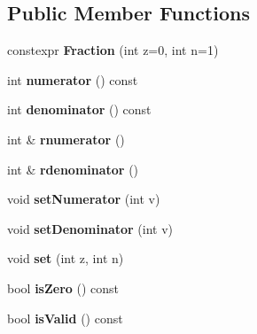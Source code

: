 \subsection*{Public Member Functions}
\begin{DoxyCompactItemize}
\item 
\mbox{\label{class_ms_1_1_fraction_adebecbbcf832847397c5864e2f1c5be7}} 
constexpr {\bfseries Fraction} (int z=0, int n=1)
\item 
\mbox{\label{class_ms_1_1_fraction_ac96ad0e3adbd7cac5e8f7264702178ff}} 
int {\bfseries numerator} () const
\item 
\mbox{\label{class_ms_1_1_fraction_af1e2d67466171dc13ed60e06f9cc3fc8}} 
int {\bfseries denominator} () const
\item 
\mbox{\label{class_ms_1_1_fraction_ae6c3b4af4c23e5958ed0d0618a86dc07}} 
int \& {\bfseries rnumerator} ()
\item 
\mbox{\label{class_ms_1_1_fraction_a299b24cc8e8da18426867638d7f6837a}} 
int \& {\bfseries rdenominator} ()
\item 
\mbox{\label{class_ms_1_1_fraction_afbafb8d881c955f439a39dfe9e07ea13}} 
void {\bfseries set\+Numerator} (int v)
\item 
\mbox{\label{class_ms_1_1_fraction_ae671ef315b71166777d5f3feeb3e3e92}} 
void {\bfseries set\+Denominator} (int v)
\item 
\mbox{\label{class_ms_1_1_fraction_a699aacd076e6ffb1415298fae0c08a92}} 
void {\bfseries set} (int z, int n)
\item 
\mbox{\label{class_ms_1_1_fraction_ac3244c876739eef5fa17e93e053bc599}} 
bool {\bfseries is\+Zero} () const
\item 
\mbox{\label{class_ms_1_1_fraction_acc3076889cb6d4019cd1406411c3656c}} 
bool {\bfseries is\+Valid} () const
\item 
\mbox{\label{class_ms_1_1_fraction_a65efbab334943fc56b8a7444ea087415}} 

\end{DoxyCompactItemize}
